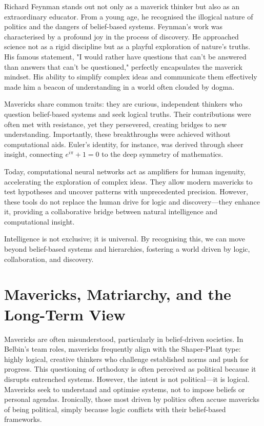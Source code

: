 \documentclass[12pt]{article}
\begin{document}
Richard Feynman stands out not only as a maverick thinker but also as an extraordinary educator. From a young age, he recognised the illogical nature of politics and the dangers of belief-based systems. Feynman’s work was characterised by a profound joy in the process of discovery. He approached science not as a rigid discipline but as a playful exploration of nature’s truths. His famous statement, "I would rather have questions that can’t be answered than answers that can’t be questioned," perfectly encapsulates the maverick mindset. His ability to simplify complex ideas and communicate them effectively made him a beacon of understanding in a world often clouded by dogma.

Mavericks share common traits: they are curious, independent thinkers who question belief-based systems and seek logical truths. Their contributions were often met with resistance, yet they persevered, creating bridges to new understanding. Importantly, these breakthroughs were achieved without computational aids. Euler’s identity, for instance, was derived through sheer insight, connecting \(e^{i\pi} + 1 = 0\) to the deep symmetry of mathematics.

Today, computational neural networks act as amplifiers for human ingenuity, accelerating the exploration of complex ideas. They allow modern mavericks to test hypotheses and uncover patterns with unprecedented precision. However, these tools do not replace the human drive for logic and discovery—they enhance it, providing a collaborative bridge between natural intelligence and computational insight.

Intelligence is not exclusive; it is universal. By recognising this, we can move beyond belief-based systems and hierarchies, fostering a world driven by logic, collaboration, and discovery.

\section*{Mavericks, Matriarchy, and the Long-Term View}

Mavericks are often misunderstood, particularly in belief-driven societies. In Belbin’s team roles, mavericks frequently align with the Shaper-Plant type: highly logical, creative thinkers who challenge established norms and push for progress. This questioning of orthodoxy is often perceived as political because it disrupts entrenched systems. However, the intent is not political—it is logical. Mavericks seek to understand and optimise systems, not to impose beliefs or personal agendas. Ironically, those most driven by politics often accuse mavericks of being political, simply because logic conflicts with their belief-based frameworks.
\end{document}
